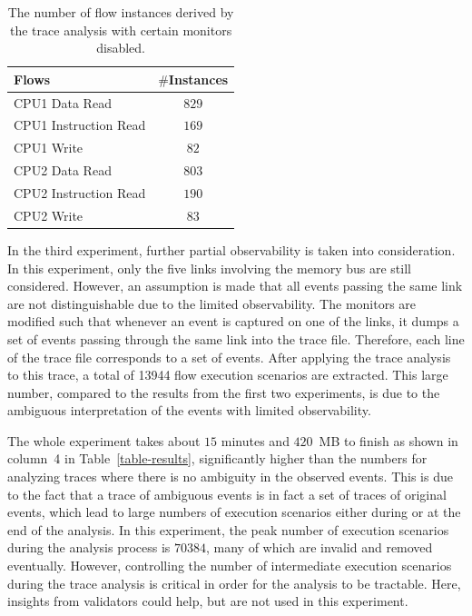 \documentclass[conference]{IEEEtran}
\begin{document}
\begin{table}[tb]
\caption{The number of flow instances derived by the trace analysis with certain monitors disabled.}
\begin{center}
\begin{tabular}{|l|c|}
\hline
Flows & $\#$Instances \\
\hline
\hline
CPU1 Data Read			&  $829$\\
CPU1 Instruction Read		&  $169$\\
CPU1 Write				&  $82$\\
\hline
CPU2 Data Read			&  $803$\\
CPU2 Instruction Read		&  $190$\\
CPU2 Write				&  $83$\\
\hline
\end{tabular}
\end{center}
\label{table-par-obs}
\end{table}%

In the third experiment, further partial observability is taken into consideration.  In this experiment, only the five links involving the memory bus are still considered.  However, an assumption is made that all events passing the same link are not distinguishable due to the limited observability.  The monitors are modified such that whenever an event is captured on one of the links, it dumps a set of events passing through the same link into the trace file.  Therefore, each line of the trace file corresponds to a set of events.  After applying the trace analysis to this trace,  a total of 13944 flow execution scenarios are extracted.    This large number, compared to the results from the first two experiments, is due to the ambiguous interpretation of the events with limited observability.  

The whole experiment takes about $15$ minutes and $420$~MB to finish as shown in column~4
in Table~\ref{table-results}, significantly higher than the numbers for analyzing traces where there is no ambiguity in the observed events.  This is due to the fact that a trace of ambiguous events is in fact a set of traces of original events, which lead to large numbers of execution scenarios either during or at the end of the analysis.  In this experiment, the peak number of execution scenarios during the analysis process is $70384$, many of which are invalid and removed eventually.  However, controlling the number of intermediate execution scenarios during the trace analysis is critical in order for the analysis to be tractable.  Here, insights from validators could help, but are not used in this experiment.   
\end{document}
